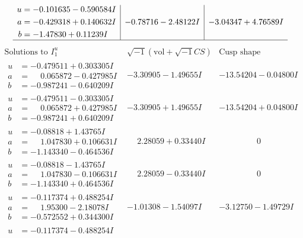 \documentclass[1p]{elsarticle_modified}
\theoremstyle{definition}
\newcommand{\I}{\sqrt{-1}}
\begin{document}
$$\begin{array}{c|c|c}
\begin{aligned}
u &= -0.101635 - 0.590584 I \\
a &= -0.429318 + 0.140632 I \\
b &= -1.47830 + 0.11239 I\end{aligned}
 & -0.78716 - 2.48122 I & -3.04347 + 4.76589 I\\
 \hline 
 \end{array}$$\newpage$$\begin{array}{c|c|c}  
\text{Solutions to }I^u_{1}& \I (\text{vol} + \sqrt{-1}CS) & \text{Cusp shape}\\
 \hline 
\begin{aligned}
u &= -0.479511 + 0.303305 I \\
a &= \phantom{-}0.065872 - 0.427985 I \\
b &= -0.987241 - 0.640209 I\end{aligned}
 & -3.30905 - 1.49655 I & -13.54204 - 0.04800 I \\ \hline\begin{aligned}
u &= -0.479511 - 0.303305 I \\
a &= \phantom{-}0.065872 + 0.427985 I \\
b &= -0.987241 + 0.640209 I\end{aligned}
 & -3.30905 + 1.49655 I & -13.54204 + 0.04800 I \\ \hline\begin{aligned}
u &= -0.08818 + 1.43765 I \\
a &= \phantom{-}1.047830 + 0.106631 I \\
b &= -1.143340 - 0.464536 I\end{aligned}
 & \phantom{-}2.28059 + 0.33440 I & \phantom{-0.000000 } 0 \\ \hline\begin{aligned}
u &= -0.08818 - 1.43765 I \\
a &= \phantom{-}1.047830 - 0.106631 I \\
b &= -1.143340 + 0.464536 I\end{aligned}
 & \phantom{-}2.28059 - 0.33440 I & \phantom{-0.000000 } 0 \\ \hline\begin{aligned}
u &= -0.117374 + 0.488254 I \\
a &= \phantom{-}1.95300 - 2.18078 I \\
b &= -0.572552 + 0.344300 I\end{aligned}
 & -1.01308 - 1.54097 I & -3.12750 - 1.49729 I \\ \hline\begin{aligned}
u &= -0.117374 - 0.488254 I \\

\end{aligned}
\end{array}$$
\end{document}
